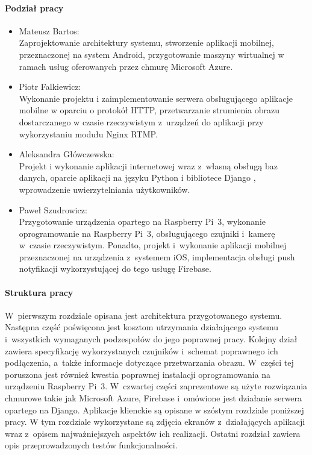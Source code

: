 \paragraph{Podział pracy}
\begin{itemize}
\item Mateusz Bartos: \\
Zaprojektowanie architektury systemu, stworzenie aplikacji mobilnej, przeznaczonej na system Android, przygotowanie maszyny wirtualnej w ramach usług oferowanych przez chmurę Microsoft Azure.
\item Piotr Falkiewicz: \\
Wykonanie projektu i zaimplementowanie serwera obsługującego aplikacje mobilne w oparciu o protokół HTTP, przetwarzanie strumienia obrazu dostarczanego w czasie rzeczywistym z~urządzeń do aplikacji przy wykorzystaniu modułu Nginx RTMP.
\item Aleksandra Główczewska: \\
Projekt i wykonanie aplikacji internetowej wraz z~własną obsługą baz danych, oparcie aplikacji na języku Python i bibliotece Django \cite{djangoREST}, wprowadzenie uwierzytelniania użytkowników.
\item Paweł Szudrowicz: \\
Przygotowanie urządzenia opartego na Raspberry Pi~3, wykonanie oprogramowanie na Raspberry Pi~3, obsługującego czujniki i~kamerę w~czasie rzeczywistym. Ponadto, projekt i~wykonanie aplikacji mobilnej przeznaczonej na urządzenia z~systemem iOS, implementacja obsługi push notyfikacji wykorzystującej do tego usługę Firebase.
\end{itemize}

\paragraph{Struktura pracy}
W~pierwszym rozdziale opisana jest architektura przygotowanego systemu. Następna część poświęcona jest kosztom utrzymania działającego systemu i~wszystkich wymaganych podzespołów do jego poprawnej pracy. Kolejny dział zawiera specyfikację wykorzystanych czujników i~schemat poprawnego ich podłączenia, a~także informacje dotyczące przetwarzania obrazu. W~części tej poruszona jest również kwestia poprawnej instalacji oprogramowania na urządzeniu Raspberry Pi~3.  W~czwartej części zaprezentowe są użyte rozwiązania chmurowe takie jak Microsoft Azure, Firebase i~omówione jest działanie serwera opartego na Django. Aplikacje klienckie są opisane w szóstym rozdziale poniższej pracy. W tym rozdziale wykorzystane są zdjęcia ekranów z~działających aplikacji wraz z~opisem najważniejszych aspektów ich realizacji. Ostatni rozdział zawiera opis przeprowadzonych testów funkcjonalności.
